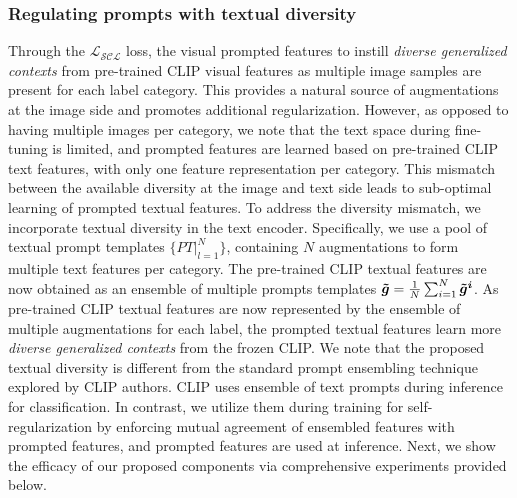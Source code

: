 \documentclass[10pt,twocolumn,letterpaper]{article}
\begin{document}
\subsubsection{Regulating prompts with textual diversity}
\label{textual_diversity_para}
Through the $\mathcal{L_{\text{SCL}}}$ loss, the visual prompted features to instill \textit{diverse generalized contexts} from pre-trained CLIP visual features as multiple image samples are present for each label category. This provides a natural source of augmentations at the image side and promotes additional regularization. However, as opposed to having multiple images per category, we note that the text space during fine-tuning is limited, and prompted features are learned based on pre-trained CLIP text features, with only one feature representation per category. This mismatch between the available diversity at the image and text side leads to sub-optimal learning of prompted textual features. To address the diversity mismatch, we incorporate textual diversity in the text encoder. Specifically, we use a pool of textual prompt templates $\{PT|_{l=1}^{N}\}$, containing $N$ augmentations to form multiple text features per category. The pre-trained CLIP textual features are now obtained as an ensemble of multiple prompts templates $\bm{\Tilde{g}} = \frac{1}{N} \sum_{i=1}^{N} \bm{\Tilde{g}^{i}}$. As pre-trained CLIP textual features are now represented by the ensemble of multiple augmentations for each label, the prompted textual features learn more \textit{diverse generalized contexts} from the frozen CLIP. We note that the proposed textual diversity is different from the standard prompt ensembling technique explored by CLIP authors. CLIP uses ensemble of text prompts during inference for classification. In contrast, we utilize them during training for self-regularization by enforcing mutual agreement of ensembled features with prompted features, and prompted features are used at inference. Next, we show the efficacy of our proposed components via comprehensive experiments provided below.
\end{document}
